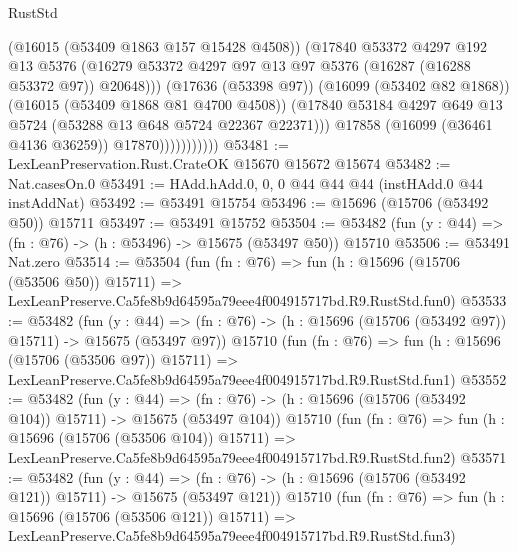 \begin{lexlean}{RustStd}
\begin{coremodule}
                              (@16015 (@53409 @1863 @157 @15428 @4508))
                              (@17840
                                @53372
                                @4297
                                @192
                                @13
                                @5376
                                (@16279
                                  @53372
                                  @4297
                                  @97
                                  @13
                                  @97
                                  @5376
                                  (@16287 (@16288 @53372 @97))
                                  @20648)))
                            (@17636 (@53398 @97))
                            (@16099 (@53402 @82 @1868))
                            (@16015 (@53409 @1868 @81 @4700 @4508))
                            (@17840
                              @53184
                              @4297
                              @649
                              @13
                              @5724
                              (@53288 @13 @648 @5724 @22367 @22371)))
                          @17858
                          (@16099 (@36461 @4136 @36259))
                          @17870)))))))))))
@53481 := LexLeanPreservation.Rust.CrateOK @15670 @15672 @15674
@53482 := Nat.casesOn.{0}
@53491 := HAdd.hAdd.{0, 0, 0} @44 @44 @44 (instHAdd.{0} @44 instAddNat)
@53492 := @53491 @15754
@53496 := @15696 (@15706 (@53492 @50)) @15711
@53497 := @53491 @15752
@53504 := @53482 (fun (y : @44) => (fn : @76) -> (h : @53496) -> @15675 (@53497 @50)) @15710
@53506 := @53491 Nat.zero
@53514 := @53504
    (fun (fn : @76) =>
    fun (h : @15696 (@15706 (@53506 @50)) @15711) =>
    LexLeanPreserve.Ca5fe8b9d64595a79eee4f004915717bd.R9.RustStd.fun0)
@53533 := @53482
    (fun (y : @44) =>
    (fn : @76) -> (h : @15696 (@15706 (@53492 @97)) @15711) -> @15675 (@53497 @97))
    @15710
    (fun (fn : @76) =>
    fun (h : @15696 (@15706 (@53506 @97)) @15711) =>
    LexLeanPreserve.Ca5fe8b9d64595a79eee4f004915717bd.R9.RustStd.fun1)
@53552 := @53482
    (fun (y : @44) =>
    (fn : @76) -> (h : @15696 (@15706 (@53492 @104)) @15711) -> @15675 (@53497 @104))
    @15710
    (fun (fn : @76) =>
    fun (h : @15696 (@15706 (@53506 @104)) @15711) =>
    LexLeanPreserve.Ca5fe8b9d64595a79eee4f004915717bd.R9.RustStd.fun2)
@53571 := @53482
    (fun (y : @44) =>
    (fn : @76) -> (h : @15696 (@15706 (@53492 @121)) @15711) -> @15675 (@53497 @121))
    @15710
    (fun (fn : @76) =>
    fun (h : @15696 (@15706 (@53506 @121)) @15711) =>
    LexLeanPreserve.Ca5fe8b9d64595a79eee4f004915717bd.R9.RustStd.fun3)

\end{coremodule}
\end{lexlean}
